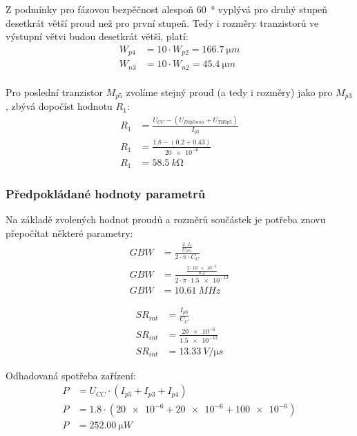    Z podmínky pro fázovou bezpěčnost alespoň \qty{60}{\degree} vyplývá pro druhý stupeň desetkrát větší proud než pro první stupeň. Tedy i rozměry tranzistorů ve výstupní větvi budou desetkrát větší, platí:
    \begin{align*}
        W_{p4} &= 10\cdot W_{p2} = \qty{166.7}{\micro m} \\
        W_{n3} &= 10\cdot W_{n2} = \qty{45.4}{\micro m} \\
    \end{align*}

    Pro poslední tranzistor \(M_{p5} \) zvolíme stejný proud (a tedy i rozměry) jako pro \(M_{p3} \), zbývá dopočíst hodnotu \(R_{1}\):
    \begin{align*}
        R_{1} &= \frac{U_{CC} - (U_{DSp5min} + U_{TH0p5})  }{I_{p5} } \\
        R_{1} &= \frac{\num{1.8} - (\num{0.2} + \num{0.43}) }{\num{20e-6} } \\
        R_{1} &= \qty{58.5}{k\ohm}
    \end{align*}

    

\subsubsection{Předpokládané hodnoty parametrů}
    Na základě zvolených hodnot proudů a rozměrů součástek je potřeba znovu přepočítat některé parametry:
    \begin{align*}
        GBW &= \frac{\frac{2\cdot I_{1} }{U_{OV1} }}{2\cdot \pi \cdot C_{C} } \\ 
        GBW &= \frac{\frac{2\cdot \num{10e-6} }{\num{0.2} }}{2\cdot \pi \cdot \num{1.5e-12} } \\ 
        GBW &= \qty{10.61}{MHz}
    \end{align*}

    \begin{align*}
        SR_{int}  &= \frac{I_{p3}}{C_{C} } \\ 
        SR_{int}  &= \frac{\num{20e-6}}{\num{1.5e-12}} \\ 
        SR_{int}  &= \qty{13.33}{V \per\micro s}
    \end{align*}

    Odhadovaná spotřeba zařízení:
    \begin{align*}
        P&=U_{CC}\cdot (I_{p5} +I_{p3} +I_{p4} ) \\
        P&=\num{1.8}\cdot (\num{20e-6} +\num{20e-6} +\num{100e-6} ) \\
        P&=\qty{252.00}{\micro W} \\
    \end{align*}

